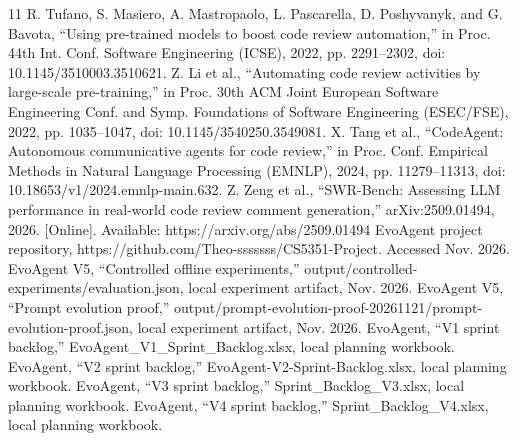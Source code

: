 \documentclass[journal,compsoc]{IEEEtran}
\begin{document}
\begin{thebibliography}{11}
 R. Tufano, S. Masiero, A. Mastropaolo, L. Pascarella, D. Poshyvanyk, and G. Bavota, “Using pre-trained models to boost code review automation,” in Proc. 44th Int. Conf. Software Engineering (ICSE), 2022, pp. 2291–2302, doi: 10.1145/3510003.3510621.
 Z. Li et al., “Automating code review activities by large-scale pre-training,” in Proc. 30th ACM Joint European Software Engineering Conf. and Symp. Foundations of Software Engineering (ESEC/FSE), 2022, pp. 1035–1047, doi: 10.1145/3540250.3549081.
 X. Tang et al., “CodeAgent: Autonomous communicative agents for code review,” in Proc. Conf. Empirical Methods in Natural Language Processing (EMNLP), 2024, pp. 11279–11313, doi: 10.18653/v1/2024.emnlp-main.632.
 Z. Zeng et al., “SWR-Bench: Assessing LLM performance in real-world code review comment generation,” arXiv:2509.01494, 2026. [Online]. Available: https://arxiv.org/abs/2509.01494
 EvoAgent project repository, https://github.com/Theo-sssssss/CS5351-Project. Accessed Nov. 2026.
 EvoAgent V5, “Controlled offline experiments,” output/controlled-experiments/evaluation.json, local experiment artifact, Nov. 2026.
 EvoAgent V5, “Prompt evolution proof,” output/prompt-evolution-proof-20261121/prompt-evolution-proof.json, local experiment artifact, Nov. 2026.
 EvoAgent, “V1 sprint backlog,” EvoAgent\_V1\_Sprint\_Backlog.xlsx, local planning workbook.
 EvoAgent, “V2 sprint backlog,” EvoAgent-V2-Sprint-Backlog.xlsx, local planning workbook.
 EvoAgent, “V3 sprint backlog,” Sprint\_Backlog\_V3.xlsx, local planning workbook.
 EvoAgent, “V4 sprint backlog,” Sprint\_Backlog\_V4.xlsx, local planning workbook.
\end{thebibliography}
\end{document}
